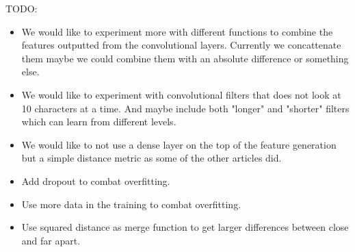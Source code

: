 TODO:
\begin{itemize}
    \item We would like to experiment more with different functions to combine
        the features outputted from the convolutional layers. Currently we
        concattenate them maybe we could combine them with an absolute
        difference or something else.
    \item We would like to experiment with convolutional filters that does not
        look at 10 characters at a time. And maybe include both "longer" and
        "shorter" filters which can learn from different levels.
    \item We would like to not use a dense layer on the top of the feature
        generation but a simple distance metric as some of the other articles
        did.
    \item Add dropout to combat overfitting.
    \item Use more data in the training to combat overfitting.
\end{itemize}


\begin{itemize}
    \item Use squared distance as merge function to get larger differences
        between close and far apart.
\end{itemize}
